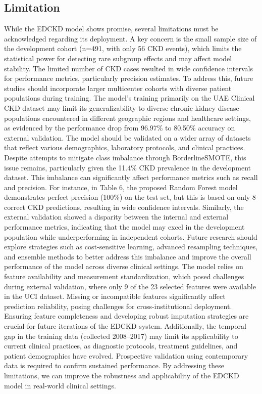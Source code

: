 \subsection*{Limitation}
While the EDCKD model shows promise, several limitations must be acknowledged regarding its deployment. A key concern is the small sample size of the development cohort (n=491, with only 56 CKD events), which limits the statistical power for detecting rare subgroup effects and may affect model stability. The limited number of CKD cases resulted in wide confidence intervals for performance metrics, particularly precision estimates. To address this, future studies should incorporate larger multicenter cohorts with diverse patient populations during training. The model's training primarily on the UAE Clinical CKD dataset may limit its generalizability to diverse chronic kidney disease populations encountered in different geographic regions and healthcare settings, as evidenced by the performance drop from 96.97\% to 80.50\% accuracy on external validation. The model should be validated on a wider array of datasets that reflect various demographics, laboratory protocols, and clinical practices. Despite attempts to mitigate class imbalance through BorderlineSMOTE, this issue remains, particularly given the 11.4\% CKD prevalence in the development dataset. This imbalance can significantly affect performance metrics such as recall and precision. For instance, in Table 6, the proposed Random Forest model demonstrates perfect precision (100\%) on the test set, but this is based on only 8 correct CKD predictions, resulting in wide confidence intervals. Similarly, the external validation showed a disparity between the internal and external performance metrics, indicating that the model may excel in the development population while underperforming in independent cohorts. Future research should explore strategies such as cost-sensitive learning, advanced resampling techniques, and ensemble methods to better address this imbalance and improve the overall performance of the model across diverse clinical settings. The model relies on feature availability and measurement standardization, which posed challenges during external validation, where only 9 of the 23 selected features were available in the UCI dataset. Missing or incompatible features significantly affect prediction reliability, posing challenges for cross-institutional deployment. Ensuring feature completeness and developing robust imputation strategies are crucial for future iterations of the EDCKD system. Additionally, the temporal gap in the training data (collected 2008--2017) may limit its applicability to current clinical practices, as diagnostic protocols, treatment guidelines, and patient demographics have evolved. Prospective validation using contemporary data is required to confirm sustained performance. By addressing these limitations, we can improve the robustness and applicability of the EDCKD model in real-world clinical settings.
